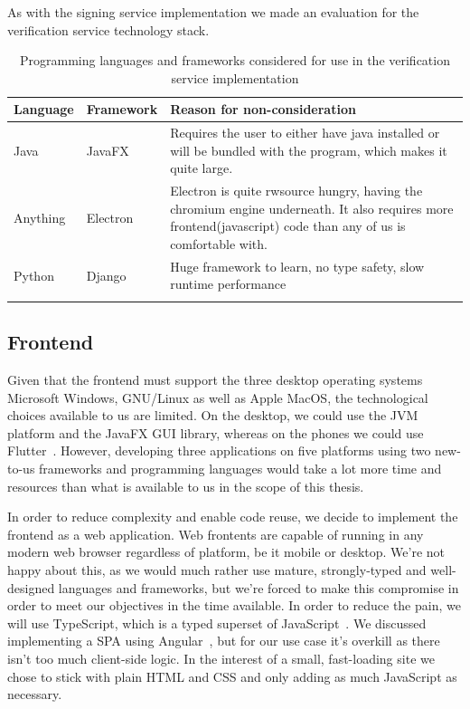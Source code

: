 As with the signing service implementation we made an evaluation for the verification service technology stack.

\begin{longtable}{p{1.5cm}p{2cm}p{11cm}}
    \hline
    \textbf{Language} & \textbf{Framework} & \textbf{Reason for non-consideration} \\ \hline
    Java & JavaFX & Requires the user to either have java installed or will be bundled with the program, which makes it quite large.  \\ \hline
    Anything & Electron & Electron is quite rwsource hungry, having the chromium engine underneath. It also requires more frontend(javascript) code than any of us is comfortable with. \\ \hline
    Python & Django & Huge framework to learn, no type safety, slow runtime performance \\ \hline
    \caption{Programming languages and frameworks considered for use in the verification service implementation}
\end{longtable}


\subsection{Frontend}
\label{subsec:techfrontend}

Given that the frontend must support the three desktop operating systems Microsoft Windows,
GNU/Linux as well as Apple MacOS,
the technological choices available to us are limited.
On the desktop, we could use the \gls{JVM} platform and the JavaFX \gls{GUI} library, whereas on the phones
we could use Flutter~\cite{flutterframework}.
However, developing three applications on five platforms using two new-to-us frameworks and programming languages
would take a lot more time and resources than what is available to us in the scope of this thesis.

In order to reduce complexity and enable code reuse, we decide to implement the frontend as a web application.
Web frontents are capable of running in any modern web browser regardless of platform, be it mobile or desktop.
We're not happy about this, as we would much rather use mature, strongly-typed and well-designed languages and frameworks,
but we're forced to make this compromise in order to meet our objectives in the time available.
In order to reduce the pain, we will use TypeScript, which is a typed superset of JavaScript~\cite{loltypes}.
We discussed implementing a \gls{SPA} using Angular~\cite{angular},
but for our use case it's overkill as there isn't too much client-side logic.
In the interest of a small, fast-loading site we chose to stick with plain \gls{HTML} and \gls{CSS}
and only adding as much JavaScript as necessary.

